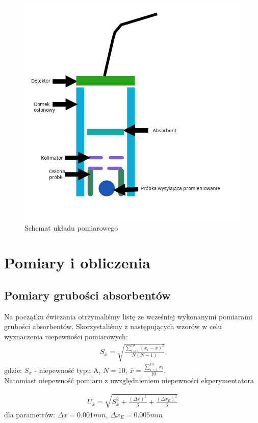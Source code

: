 \documentclass[a4paper]{article}
\newlength{\du}
\begin{document}
\begin{figure}[h!]
\centering
\includegraphics[scale=0.6]{schemat_ukladu}
\caption{Schemat układu pomiarowego}
\label{uklad_pomiarowy}
\end{figure}


\section{Pomiary i obliczenia}
\subsection{Pomiary grubości absorbentów}
Na początku ćwiczania otrzymaliśmy listę ze wcześniej wykonanymi pomiarami grubości absorbentów. Skorzystaliśmy z następujących wzorów w  celu wyznaczenia niepewności pomiarowych: 
\begin{align*}
S_{\bar{x}} = \sqrt{\frac{\sum_{i=1}^{10}(x_i-\bar{x})^2}{N(N-1)}}
\end{align*}
gdzie: $S_{\bar{x}}$ - niepewność typu A, $N = 10$, $\bar{x} = \frac{\sum_{i=1}^{10}x_i}{10}$. \\
Natomiast niepewność pomiaru z uwzględnieniem niepewności ekperymentatora

\begin{align*}
U_{\bar{x}} = \sqrt{S_{\bar{x}}^2 + \frac{(\Delta x)^2}{3} + \frac{(\Delta x_E)^2}{3}}
\end{align*}
dla parametrów: $\Delta x = 0.001 mm$, $\Delta x_E = 0.005 mm$
\end{document}
